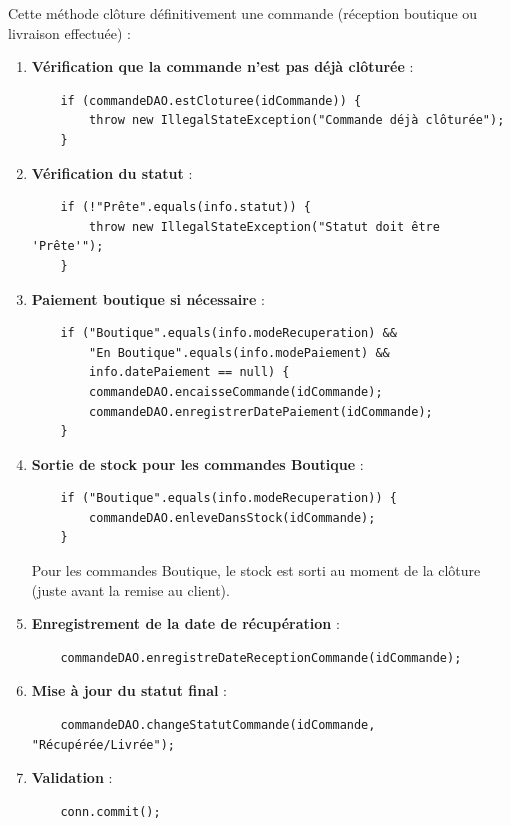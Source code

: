 Cette méthode clôture définitivement une commande (réception boutique ou livraison effectuée) :

\begin{enumerate}
    \item \textbf{Vérification que la commande n'est pas déjà clôturée} :
    \begin{verbatim}
    if (commandeDAO.estCloturee(idCommande)) {
        throw new IllegalStateException("Commande déjà clôturée");
    }
    \end{verbatim}
    
    \item \textbf{Vérification du statut} :
    \begin{verbatim}
    if (!"Prête".equals(info.statut)) {
        throw new IllegalStateException("Statut doit être 'Prête'");
    }
    \end{verbatim}
    
    \item \textbf{Paiement boutique si nécessaire} :
    \begin{verbatim}
    if ("Boutique".equals(info.modeRecuperation) && 
        "En Boutique".equals(info.modePaiement) && 
        info.datePaiement == null) {
        commandeDAO.encaisseCommande(idCommande);
        commandeDAO.enregistrerDatePaiement(idCommande);
    }
    \end{verbatim}
    
    \item \textbf{Sortie de stock pour les commandes Boutique} :
    \begin{verbatim}
    if ("Boutique".equals(info.modeRecuperation)) {
        commandeDAO.enleveDansStock(idCommande);
    }
    \end{verbatim}
    Pour les commandes Boutique, le stock est sorti au moment de la clôture (juste avant la remise au client).
    
    \item \textbf{Enregistrement de la date de récupération} :
    \begin{verbatim}
    commandeDAO.enregistreDateReceptionCommande(idCommande);
    \end{verbatim}
    
    \item \textbf{Mise à jour du statut final} :
    \begin{verbatim}
    commandeDAO.changeStatutCommande(idCommande, "Récupérée/Livrée");
    \end{verbatim}
    
    \item \textbf{Validation} :
    \begin{verbatim}
    conn.commit();
    \end{verbatim}
\end{enumerate}

